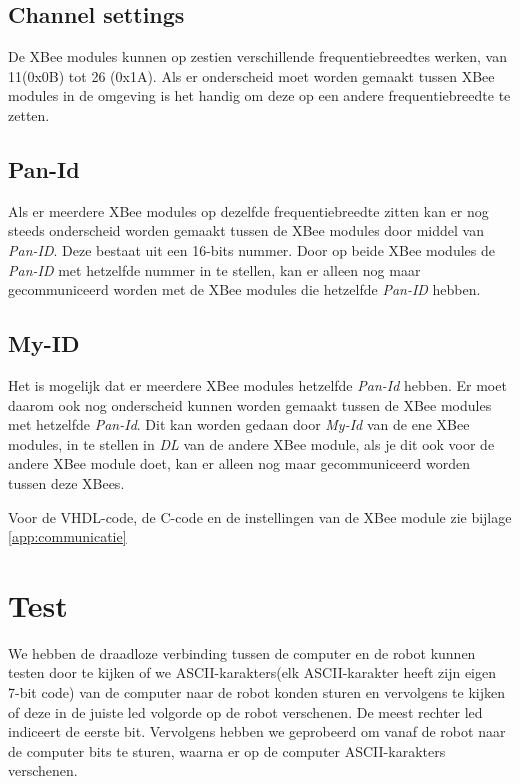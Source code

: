 \documentclass{report}
\begin{document}
\subsection{Channel settings}
De XBee modules kunnen op zestien verschillende frequentiebreedtes werken, van 11(0x0B) tot 26 (0x1A).
Als er onderscheid moet worden gemaakt tussen XBee modules in de omgeving is het handig om deze op een andere frequentiebreedte te zetten.\\

\subsection{Pan-Id}
Als er meerdere XBee modules op dezelfde frequentiebreedte zitten kan er nog steeds onderscheid worden gemaakt tussen de XBee modules door middel van \textit{Pan-ID}.
Deze bestaat uit een 16-bits nummer.
Door op beide XBee modules de \textit{Pan-ID}  met hetzelfde nummer in te stellen, kan er alleen nog maar gecommuniceerd worden met de XBee modules die hetzelfde \textit{Pan-ID} hebben.

\subsection{My-ID}
Het is mogelijk dat er meerdere XBee modules hetzelfde\textit{ Pan-Id} hebben.
Er moet daarom ook nog onderscheid kunnen worden gemaakt tussen de XBee modules met hetzelfde \textit{Pan-Id}.
Dit kan worden gedaan door \textit{My-Id} van de ene XBee modules, in te stellen in \textit{DL} van de andere XBee module, als je dit ook voor de andere XBee module doet, kan er alleen nog maar gecommuniceerd worden tussen deze XBees.


Voor de VHDL-code, de C-code en de instellingen van de XBee module zie bijlage \ref{app:communicatie}

\section{Test}

We hebben de draadloze verbinding tussen de computer en de robot kunnen testen door te kijken of we ASCII-karakters(elk ASCII-karakter heeft zijn eigen 7-bit code) van de computer naar de robot konden sturen en vervolgens te kijken of deze in de juiste led volgorde op de robot verschenen. De meest rechter led indiceert de eerste bit. Vervolgens hebben we geprobeerd om vanaf de robot naar de computer bits te sturen, waarna er op de computer ASCII-karakters verschenen.
\end{document}
